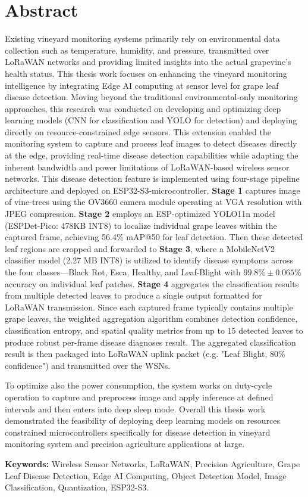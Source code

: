 \chapter*{Abstract}
Existing vineyard monitoring systems primarily rely on environmental data collection such as temperature, humidity, and pressure, transmitted over LoRaWAN networks and providing limited insights into the actual grapevine's health status. This thesis work focuses on enhancing the vineyard monitoring intelligence by integrating Edge AI computing at sensor level for grape leaf disease detection. Moving beyond the traditional environmental-only monitoring approaches, this research was conducted on developing and optimizing deep learning models (CNN for classification and YOLO for detection) and deploying directly on resource-constrained edge sensors. This extension enabled the monitoring system to capture and process leaf images to detect diseases directly at the edge, providing real-time disease detection capabilities while adapting the inherent bandwidth and power limitations of LoRaWAN-based wireless sensor networks. This disease detection feature is implemented using four-stage pipeline architecture and deployed on ESP32-S3-microcontroller. \textbf{Stage 1} captures image of vine-trees using the OV3660 camera module operating at VGA resolution with JPEG compression. \textbf{Stage 2} employs  an ESP-optimized YOLO11n model (ESPDet-Pico: 478KB INT8) to localize individual grape leaves within the captured frame, achieving  56.4\% mAP@50 for leaf detection. Then these detected leaf regions are cropped and forwarded to \textbf{Stage 3}, where a MobileNetV2 classifier model (2.27 MB INT8) is utilized to identify disease symptoms across the four classes—Black Rot, Esca, Healthy, and Leaf-Blight with $99.8\% \pm 0.065\%$ accuracy on individual leaf patches. \textbf{Stage 4} aggregates the classification results from multiple detected leaves to produce a single output formatted for LoRaWAN transmission. Since each captured frame typically contains multiple grape leaves, the weighted aggregation algorithm combines detection confidence, classification entropy, and spatial quality metrics from up to 15 detected leaves to produce robust per-frame disease diagnoses result. The aggregated classification result is then packaged into LoRaWAN uplink packet (e.g. "Leaf Blight, 80\% confidence") and transmitted over the WSNs.

To optimize also the power consumption, the system works on duty-cycle operation to capture and preprocess image and apply inference at defined intervals and then enters into deep sleep mode. Overall this thesis work demonstrated the feasibility of deploying deep learning models on resources constrained microcontrollers specifically for disease detection in vineyard monitoring system and precision agriculture applications at large.

\vspace{1cm}

\noindent\textbf{Keywords:} Wireless Sensor Networks, LoRaWAN, Precision Agriculture, Grape Leaf Disease Detection, Edge AI Computing, Object Detection Model, Image Classification, Quantization, ESP32-S3.

